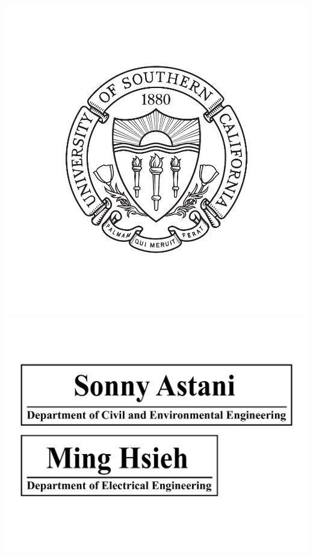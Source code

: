 \begin{titlepage}
\begin{center}


\includegraphics[scale = 0.4]{./USCsealblack.pdf}\\[0.5cm]
\includegraphics[scale = 0.25]{./sonny}\\[0.5cm]


\end{center}
\end{titlepage}
